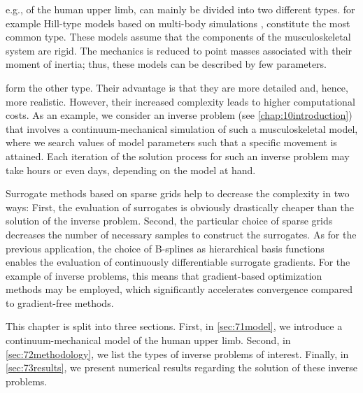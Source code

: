 
\label{chap:70muscle}

e.g., of the human upper limb, can mainly be divided into two different types.
for example Hill-type models based on multi-body simulations
,
constitute the most common type.
These models assume that the components of the musculoskeletal system
are rigid.
The mechanics is reduced to point masses
associated with their moment of inertia;
thus, these models can be described by few parameters.

 form the other type.
Their advantage is that they are more detailed and, hence, more realistic.
However, their increased complexity leads to higher computational costs.
As an example, we consider an inverse problem (see \cref{chap:10introduction})
that involves a continuum-mechanical simulation of such a
musculoskeletal model,
where we search values of model parameters
such that a specific movement is attained.
Each iteration of the solution process for such an inverse problem
may take hours or even days, depending on the model at hand.

Surrogate methods based on sparse grids help to decrease the complexity
in two ways:
First, the evaluation of surrogates is obviously drastically cheaper
than the solution of the inverse problem.
Second, the particular choice of sparse grids decreases the number
of necessary samples to construct the surrogates.
As for the previous application,
the choice of B-splines as hierarchical basis functions enables
the evaluation of continuously differentiable surrogate gradients.
For the example of inverse problems, this means that
gradient-based optimization methods may be employed,
which significantly accelerates convergence compared to gradient-free methods.

This chapter is split into three sections.
First, in \cref{sec:71model}, we introduce a continuum-mechanical
model of the human upper limb.
Second, in \cref{sec:72methodology}, we list the types of inverse problems
of interest.
Finally, in \cref{sec:73results}, we present numerical results
regarding the solution of these inverse problems.

